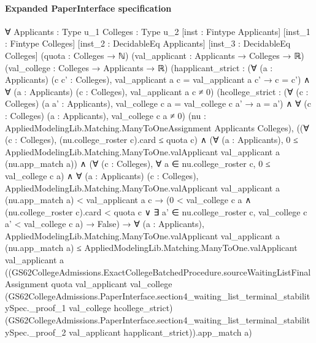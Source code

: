\documentclass[10pt]{article}
\begin{document}
\paragraph{Expanded PaperInterface specification}
\begin{ReviewVerbatim}
∀ {Applicants : Type u_1} {Colleges : Type u_2} [inst : Fintype Applicants] [inst_1 : Fintype Colleges]
  [inst_2 : DecidableEq Applicants] [inst_3 : DecidableEq Colleges] (quota : Colleges → ℕ)
  (val_applicant : Applicants → Colleges → ℝ) (val_college : Colleges → Applicants → ℝ)
  (happlicant_strict :
    (∀ (a : Applicants) (c c' : Colleges), val_applicant a c = val_applicant a c' → c = c') ∧
      ∀ (a : Applicants) (c : Colleges), val_applicant a c ≠ 0)
  (hcollege_strict :
    (∀ (c : Colleges) (a a' : Applicants), val_college c a = val_college c a' → a = a') ∧
      ∀ (c : Colleges) (a : Applicants), val_college c a ≠ 0)
  (nu : AppliedModelingLib.Matching.ManyToOneAssignment Applicants Colleges),
  ((∀ (c : Colleges), (nu.college_roster c).card ≤ quota c) ∧
      (∀ (a : Applicants), 0 ≤ AppliedModelingLib.Matching.ManyToOne.valApplicant val_applicant a (nu.app_match a)) ∧
        (∀ (c : Colleges), ∀ a ∈ nu.college_roster c, 0 ≤ val_college c a) ∧
          ∀ (a : Applicants) (c : Colleges),
            AppliedModelingLib.Matching.ManyToOne.valApplicant val_applicant a (nu.app_match a) < val_applicant a c →
              (0 < val_college c a ∧ (nu.college_roster c).card < quota c ∨
                  ∃ a' ∈ nu.college_roster c, val_college c a' < val_college c a) →
                False) →
    ∀ (a : Applicants),
      AppliedModelingLib.Matching.ManyToOne.valApplicant val_applicant a (nu.app_match a) ≤
        AppliedModelingLib.Matching.ManyToOne.valApplicant val_applicant a
          ((GS62CollegeAdmissions.ExactCollegeBatchedProcedure.sourceWaitingListFinalAssignment quota val_applicant
                val_college
                (GS62CollegeAdmissions.PaperInterface.section4_waiting_list_terminal_stabilitySpec._proof_1 val_college
                  hcollege_strict)
                (GS62CollegeAdmissions.PaperInterface.section4_waiting_list_terminal_stabilitySpec._proof_2
                  val_applicant happlicant_strict)).app_match
            a)
\end{ReviewVerbatim}
\end{document}
